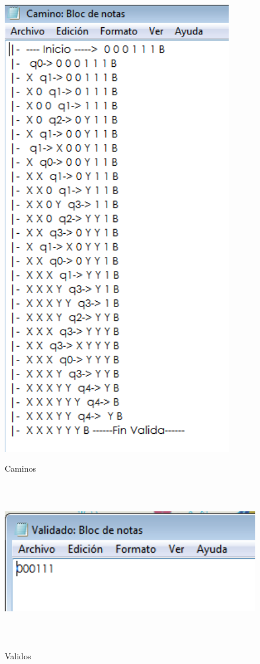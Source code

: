 \documentclass[12pt]{article}
\begin{document}
\begin{figure}[H]
\includegraphics[width=\textwidth, height=20cm]{manual_maquina_caminos}
\label{fig:manual_afn}
\caption{Caminos}
\end{figure}

\begin{figure}[H]
\includegraphics[width=\textwidth, height=7cm]{manual_maquina_validos}
\label{fig:manual_afn}
\caption{Validos}
\end{figure}
\end{document}

